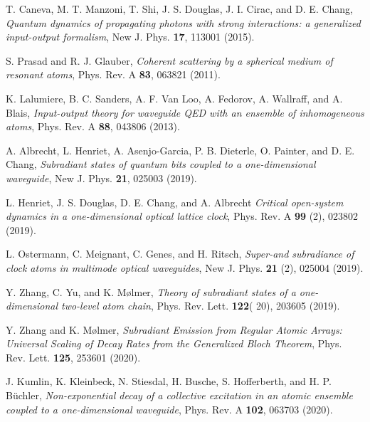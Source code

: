 \documentclass[pra,twocolumn,showpacs,preprintnumbers,amsmath,amssymb]{revtex4-1}
\begin{document}
\begin{thebibliography}{99}
 T. Caneva, M. T. Manzoni, T. Shi, J. S. Douglas, J. I. Cirac, and D. E. Chang, \textit{Quantum dynamics of propagating photons with strong interactions: a generalized input-output formalism}, New J. Phys. {\bf 17}, 113001 (2015).

 S. Prasad and R. J. Glauber, \textit{Coherent scattering by a spherical medium of resonant atoms}, Phys. Rev. A {\bf 83}, 063821  (2011).

 K. Lalumiere, B. C. Sanders, A. F. Van Loo, A. Fedorov, A. Wallraff, and A. Blais, \textit{Input-output theory for waveguide QED with an ensemble of inhomogeneous atoms}, Phys. Rev. A {\bf 88}, 043806 (2013).










 A. Albrecht, L. Henriet, A. Asenjo-Garcia, P. B. Dieterle, O. Painter, and D. E. Chang, \textit{Subradiant states of quantum bits coupled to a one-dimensional waveguide}, New J. Phys.  {\bf 21}, 025003 (2019).

 L. Henriet, J. S. Douglas, D. E. Chang, and A. Albrecht  \textit{Critical open-system dynamics in a one-dimensional optical lattice clock}, Phys. Rev. A {\bf 99} (2), 023802 (2019).

 L. Ostermann, C. Meignant, C. Genes, and H. Ritsch, \textit{Super-and subradiance of clock atoms in multimode optical waveguides}, New J. Phys.  {\bf 21} (2), 025004 (2019).


  Y. Zhang, C. Yu, and K. M\o lmer, \textit{Theory of subradiant states of a one-dimensional two-level atom chain}, Phys. Rev. Lett. {\bf 122}( 20), 203605 (2019).

 Y. Zhang  and K. M\o lmer, \textit{Subradiant Emission from Regular Atomic Arrays: Universal Scaling of Decay Rates from the Generalized Bloch Theorem}, Phys. Rev. Lett. {\bf 125}, 253601 (2020).

 J. Kumlin, K. Kleinbeck, N. Stiesdal, H. Busche, S. Hofferberth, and H. P. B\"uchler, \textit{Non-exponential decay of a collective excitation in an atomic ensemble coupled to a one-dimensional waveguide}, Phys. Rev. A {\bf 102}, 063703 (2020).




\end{thebibliography}
\end{document}
